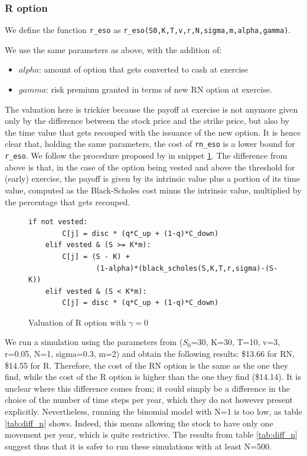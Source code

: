 \subsubsection{R option}
We define the function \verb|r_eso| as \verb|r_eso(S0,K,T,v,r,N,sigma,m,alpha,gamma)|.
    


We use the same parameters as above, with the addition of:
\begin{itemize}
    \item $alpha$: amount of option that gets converted to cash at exercise
    \item $gamma$: risk premium granted in terms of new RN option at exercise. 
\end{itemize}

The valuation here is trickier because the payoff at exercise is not anymore given only by the difference between the stock price and the strike price, but also by the time value that gets recouped with the issuance of the new option. It is hence clear that, holding the same parameters, the cost of \verb|rn_eso| is a lower bound for \verb|r_eso|. We follow the procedure proposed by \cite{huang2013dynamic} in snippet \ref*{fig:val_r_gamma0}. The difference from above is that, in the case of the option being vested and above the threshold for (early) exercise, the payoff is given by its intrinsic value plus a portion of its time value, computed as the Black-Scholes cost minus the intrinsic value, multiplied by the percentage that gets recouped. 

\begin{figure}[H]
    \begin{lstlisting}[breaklines, basicstyle=\ttfamily\small]
    if not vested:                
        C[j] = disc * (q*C_up + (1-q)*C_down)
    elif vested & (S >= K*m): 
        C[j] = (S - K) + 
                (1-alpha)*(black_scholes(S,K,T,r,sigma)-(S-K))
    elif vested & (S < K*m):
        C[j] = disc * (q*C_up + (1-q)*C_down)
    \end{lstlisting}
    \caption{Valuation of R option with $\gamma=0$}
    \label{fig:val_r_gamma0}
\end{figure}

 We run a simulation using the parameters from \cite{huang2013dynamic} ($S_0$=30, K=30, T=10, v=3, r=0.05, N=1, sigma=0.3, m=2) and obtain the following results: \$13.66 for RN, \$14.55 for R. Therefore, the cost of the RN option is the same as the one they find, while the cost of the R option is higher than the one they find (\$14.14). It is unclear where this difference comes from; it could simply be a difference in the choice of the number of time steps per year, which they do not however present explicitly. Nevertheless, running the binomial model with N=1 is too low, as table \ref*{tab:diff_n} shows. Indeed, this means allowing the stock to have only one movement per year, which is quite restrictive. The results from table \ref*{tab:diff_n} suggest thus that it is safer to run these simulations with at least N=500.

